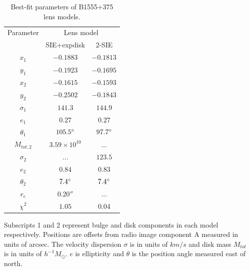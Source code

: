 \documentclass[useAMS,usenatbib]{mn2e}
\begin{document}
\begin{table}
  \caption{Best-fit parameters of B1555+375 lens models.}
  \begin{tabular}{@{}ccc}
\hline 
 Parameter  & \multicolumn{2}{c}{Lens model} \\
		&SIE+expdisk& 2-SIE		   
\\
\hline
$x_1$  	  & $-0.1883$	& $-0.1813$  \\
$y_1$	  &$-0.1923$	&$-0.1695$  \\
$x_2$	  &$-0.1615$ 	&$-0.1593$  \\
$y_2$	  &$-0.2502$	& $-0.1843$  \\
$\sigma_1$ &$141.3$     & $144.9$ \\
$e_1$	  & $0.27$	& $0.27$ \\
$\theta_1$ &$105.5 \hbox{$^\circ$}$ & $97.7 \hbox{$^\circ$}$ \\
$M_{tot,2}$  & $3.59\times 10^{10} $  & ...	 \\  
$\sigma_2$ & ...        &$123.5$ \\  
$e_2$	  &$0.84$	&$0.83$  \\
$\theta_2$ &$7.4\hbox{$^\circ$}$ &$7.4\hbox{$^\circ$}$  \\
$r_e$	  & $0.20 ''$ &  ... \\
\hline
$\chi ^2$ & $1.05$ & $0.04$ \\
\hline
\end{tabular}

\medskip
Subscripts 1 and 2 represent bulge and disk components in each model respectively. Positions are offsets from radio image component A measured in units of arcsec. The velocity dispersion $\sigma$ is in units of $km/s$ and disk mass $M_{tot}$ is in units of $h^{-1} M_{\odot}$. $e$ is ellipticity and $\theta$ is the position angle measured east of north.

\end{table}
\end{document}
